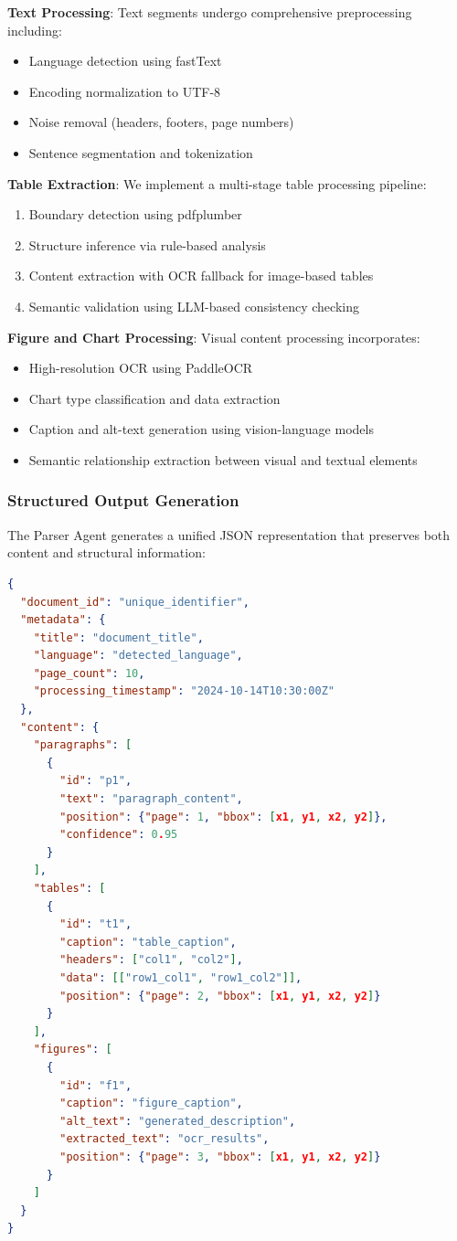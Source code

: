 \documentclass[11pt,a4paper]{article}
\begin{document}
\textbf{Text Processing}: Text segments undergo comprehensive preprocessing including:
\begin{itemize}
  \item Language detection using fastText \citep{joulin2017bag}
  \item Encoding normalization to UTF-8
  \item Noise removal (headers, footers, page numbers)
  \item Sentence segmentation and tokenization
\end{itemize}

\textbf{Table Extraction}: We implement a multi-stage table processing pipeline:
\begin{enumerate}
  \item Boundary detection using pdfplumber \citep{pdfplumber2023}
  \item Structure inference via rule-based analysis
  \item Content extraction with OCR fallback for image-based tables
  \item Semantic validation using LLM-based consistency checking
\end{enumerate}

\textbf{Figure and Chart Processing}: Visual content processing incorporates:
\begin{itemize}
  \item High-resolution OCR using PaddleOCR \citep{paddleocr2023}
  \item Chart type classification and data extraction
  \item Caption and alt-text generation using vision-language models
  \item Semantic relationship extraction between visual and textual elements
\end{itemize}

\subsubsection{Structured Output Generation}

The Parser Agent generates a unified JSON representation that preserves both content and structural information:

\begin{lstlisting}[language=json, caption=Parser Agent Output Schema]
{
  "document_id": "unique_identifier",
  "metadata": {
    "title": "document_title",
    "language": "detected_language",
    "page_count": 10,
    "processing_timestamp": "2024-10-14T10:30:00Z"
  },
  "content": {
    "paragraphs": [
      {
        "id": "p1",
        "text": "paragraph_content",
        "position": {"page": 1, "bbox": [x1, y1, x2, y2]},
        "confidence": 0.95
      }
    ],
    "tables": [
      {
        "id": "t1",
        "caption": "table_caption",
        "headers": ["col1", "col2"],
        "data": [["row1_col1", "row1_col2"]],
        "position": {"page": 2, "bbox": [x1, y1, x2, y2]}
      }
    ],
    "figures": [
      {
        "id": "f1",
        "caption": "figure_caption",
        "alt_text": "generated_description",
        "extracted_text": "ocr_results",
        "position": {"page": 3, "bbox": [x1, y1, x2, y2]}
      }
    ]
  }
}
\end{lstlisting}
\end{document}
